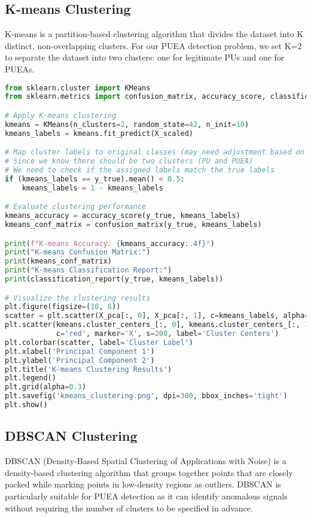 \subsection{K-means Clustering}
K-means is a partition-based clustering algorithm that divides the dataset into K distinct, non-overlapping clusters. For our PUEA detection problem, we set K=2 to separate the dataset into two clusters: one for legitimate PUs and one for PUEAs.

\begin{lstlisting}[language=Python, caption=K-means Clustering Code]
from sklearn.cluster import KMeans
from sklearn.metrics import confusion_matrix, accuracy_score, classification_report

# Apply K-means clustering
kmeans = KMeans(n_clusters=2, random_state=42, n_init=10)
kmeans_labels = kmeans.fit_predict(X_scaled)

# Map cluster labels to original classes (may need adjustment based on results)
# Since we know there should be two clusters (PU and PUEA)
# We need to check if the assigned labels match the true labels
if (kmeans_labels == y_true).mean() < 0.5:
    kmeans_labels = 1 - kmeans_labels

# Evaluate clustering performance
kmeans_accuracy = accuracy_score(y_true, kmeans_labels)
kmeans_conf_matrix = confusion_matrix(y_true, kmeans_labels)

print(f"K-means Accuracy: {kmeans_accuracy:.4f}")
print("K-means Confusion Matrix:")
print(kmeans_conf_matrix)
print("K-means Classification Report:")
print(classification_report(y_true, kmeans_labels))

# Visualize the clustering results
plt.figure(figsize=(10, 6))
scatter = plt.scatter(X_pca[:, 0], X_pca[:, 1], c=kmeans_labels, alpha=0.6, cmap='viridis')
plt.scatter(kmeans.cluster_centers_[:, 0], kmeans.cluster_centers_[:, 1], 
            c='red', marker='X', s=200, label='Cluster Centers')
plt.colorbar(scatter, label='Cluster Label')
plt.xlabel('Principal Component 1')
plt.ylabel('Principal Component 2')
plt.title('K-means Clustering Results')
plt.legend()
plt.grid(alpha=0.3)
plt.savefig('kmeans_clustering.png', dpi=300, bbox_inches='tight')
plt.show()
\end{lstlisting}

\subsection{DBSCAN Clustering}
DBSCAN (Density-Based Spatial Clustering of Applications with Noise) is a density-based clustering algorithm that groups together points that are closely packed while marking points in low-density regions as outliers. DBSCAN is particularly suitable for PUEA detection as it can identify anomalous signals without requiring the number of clusters to be specified in advance.

